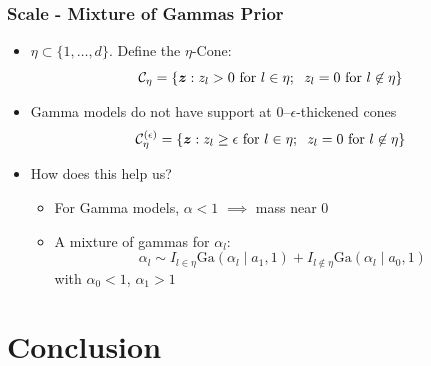 \documentclass[aspectratio=169]{beamer}
\begin{document}
\begin{frame}
  \frametitle{Scale - Mixture of Gammas Prior}
  \begin{itemize}
    \item $\eta \subset \lbrace 1,\ldots,d\rbrace$.  Define the $\eta$-Cone:
      \begin{equation*}
        \mathcal{C}_{\eta} = \left\lbrace \bm{z} : z_l > 0 \text{ for }l\in\eta;
                              \hspace{0.2cm} z_l = 0 \text{ for }l\not\in\eta\right\rbrace
      \end{equation*}
    \pause
    \item Gamma models do not have support at 0--$\epsilon$-thickened cones
      \begin{equation*}
        \mathcal{C}_{\eta}^{(\epsilon)} = \left\lbrace \bm{z} : z_l \geq \epsilon
          \text{ for }l\in\eta; \hspace{0.2cm} z_l = 0 \text{ for }l\not\in\eta\right\rbrace
      \end{equation*}
    \pause
    \item How does this help us?
      \begin{itemize}
        \item For Gamma models, $\alpha < 1$ $\implies$ mass near 0
        \item A mixture of gammas for $\alpha_l$:
          \begin{equation*}
            \alpha_l \sim I_{l\in\eta}\text{Ga}(\alpha_l\mid a_1, 1)
                        + I_{l\not\in\eta}\text{Ga}(\alpha_l\mid a_0, 1)
          \end{equation*}
          with $\alpha_0 < 1$, $\alpha_1 > 1$
      \end{itemize}
  \end{itemize}
\end{frame}

\section{Conclusion}
\end{document}
